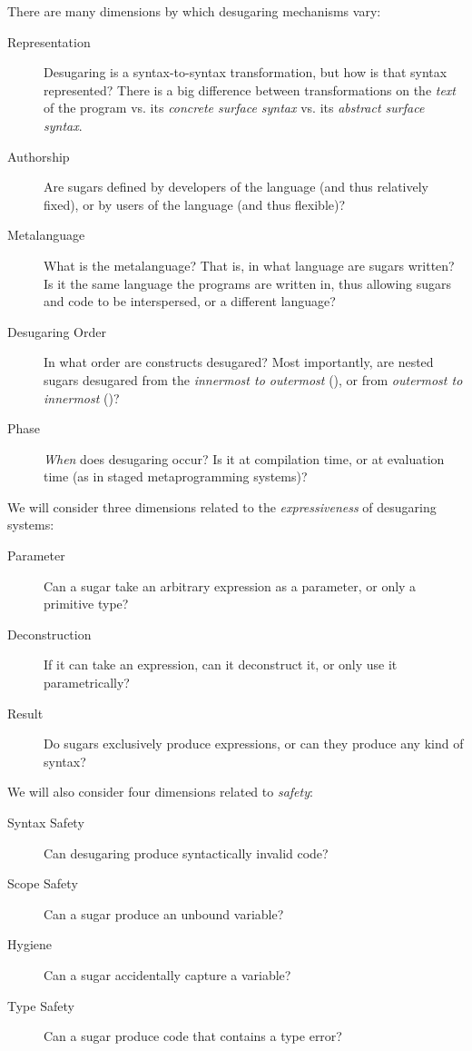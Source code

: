 There are many dimensions by which desugaring mechanisms vary:
\begin{description}
  \item[Representation] Desugaring is a syntax-to-syntax transformation, but
    how is that syntax represented? There is a big difference between
    transformations on the \emph{text} of the program vs. its
    \emph{concrete surface syntax} vs. its \emph{abstract surface
      syntax}.
  \item[Authorship] Are sugars defined by developers of the language (and thus
    relatively fixed), or by users of the language (and thus flexible)?
  \item[Metalanguage] What is the metalanguage? That is, in what language are sugars
    written? Is it the same language the programs are written in, thus
    allowing sugars and code to be interspersed, or a different
    language?
  \item[Desugaring Order] In what order are constructs desugared? Most
    importantly, are nested sugars desugared from the \emph{innermost
      to outermost} (), or from \emph{outermost to innermost}
    ()?
  \item[Phase] \emph{When} does desugaring occur? Is it at compilation time,
    or at evaluation time (as in staged metaprogramming systems)?
\end{description}
We will consider three dimensions related to the \emph{expressiveness}
of desugaring systems:
\begin{description}
  \item[Parameter] Can a sugar take an
    arbitrary expression as a parameter, or only a primitive type?
  \item[Deconstruction] If it can take an expression, can it
    deconstruct it, or only use it parametrically?
  \item[Result] Do sugars exclusively produce expressions, or can they
    produce any kind of syntax?
\end{description}
We will also consider four dimensions related to \emph{safety}:
\begin{description}
  \item[Syntax Safety] Can desugaring produce syntactically invalid
    code?
  \item[Scope Safety] Can a sugar produce an unbound variable?
  \item[Hygiene] Can a sugar accidentally capture a variable?
  \item[Type Safety] Can a sugar produce code that contains a type
    error?
\end{description}

